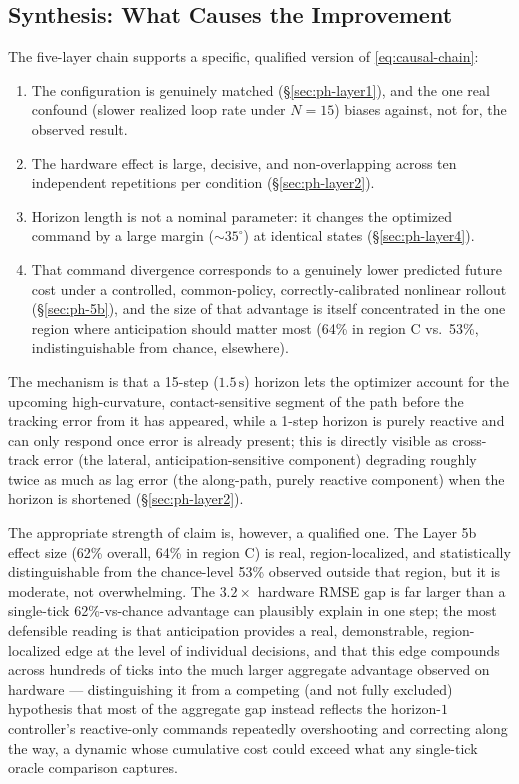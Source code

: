 \documentclass[journal]{IEEEtran}
\begin{document}
\subsection{Synthesis: What Causes the Improvement}
\label{sec:ph-synthesis}

The five-layer chain supports a specific, qualified version of
\eqref{eq:causal-chain}:
\begin{enumerate}
\item The configuration is genuinely matched (\S\ref{sec:ph-layer1}), and
  the one real confound (slower realized loop rate under $N{=}15$)
  biases against, not for, the observed result.
\item The hardware effect is large, decisive, and non-overlapping
  across ten independent repetitions per condition
  (\S\ref{sec:ph-layer2}).
\item Horizon length is not a nominal parameter: it changes the
  optimized command by a large margin ($\sim\!35^{\circ}$) at
  identical states (\S\ref{sec:ph-layer4}).
\item That command divergence corresponds to a genuinely lower
  predicted future cost under a controlled, common-policy,
  correctly-calibrated nonlinear rollout (\S\ref{sec:ph-5b}), and the
  size of that advantage is itself concentrated in the one region
  where anticipation should matter most (64\% in region C vs.\ 53\%,
  indistinguishable from chance, elsewhere).
\end{enumerate}
The mechanism is that a 15-step ($1.5\,\mathrm{s}$) horizon lets the
optimizer account for the upcoming high-curvature, contact-sensitive
segment of the path before the tracking error from it has appeared,
while a 1-step horizon is purely reactive and can only respond once
error is already present; this is directly visible as cross-track
error (the lateral, anticipation-sensitive component) degrading
roughly twice as much as lag error (the along-path, purely reactive
component) when the horizon is shortened (\S\ref{sec:ph-layer2}).

The appropriate strength of claim is, however, a qualified one. The
Layer 5b effect size (62\% overall, 64\% in region C) is real,
region-localized, and statistically distinguishable from the
chance-level 53\% observed outside that region, but it is moderate,
not overwhelming. The $3.2\times$ hardware RMSE gap is far larger than
a single-tick 62\%-vs-chance advantage can plausibly explain in one
step; the most defensible reading is that anticipation provides a
real, demonstrable, region-localized edge at the level of individual
decisions, and that this edge compounds across hundreds of ticks into
the much larger aggregate advantage observed on hardware ---
distinguishing it from a competing (and not fully excluded) hypothesis
that most of the aggregate gap instead reflects the horizon-$1$
controller's reactive-only commands repeatedly overshooting and
correcting along the way, a dynamic whose cumulative cost could exceed
what any single-tick oracle comparison captures.
\end{document}
